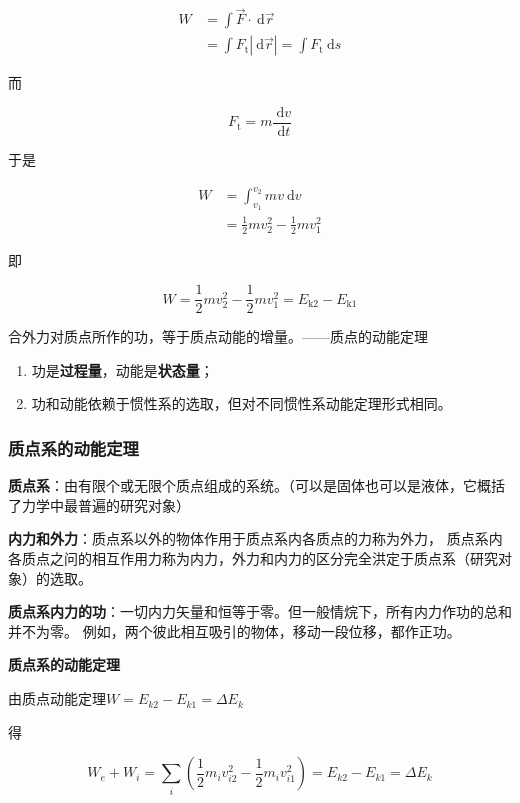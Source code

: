 \documentclass[
	12pt, %
	a4paper, %
]{myLegrandOrangeBook}
\begin{document}
$$
\begin{aligned}
    W & =\int \overrightarrow{F} \cdot \mathrm{~d} \overrightarrow{r} \\
    & =\int F_{\mathrm{t}}|\mathrm{~d} \overrightarrow{r}|=\int F_{\mathrm{t}} \mathrm{~d} s
\end{aligned}
$$

而

$$
    F_{\mathrm{t}}=m \frac{\mathrm{~d} v}{\mathrm{~d} t}
$$

于是

$$
    \begin{aligned}
    W & =\int_{v_1}^{v_2} m v \mathrm{~d} v \\
    & =\frac{1}{2} m v_2^2-\frac{1}{2} m v_1^2
    \end{aligned}
$$

即

\begin{equation}
    W=\frac{1}{2} m v_2^2-\frac{1}{2} m v_1^2=E_{\mathrm{k} 2}-E_{\mathrm{k} 1}
\end{equation}

合外力对质点所作的功，等于质点动能的增量。——质点的动能定理

\begin{enumerate}
    \item 功是\textbf{过程量}，动能是\textbf{状态量}；
    \item 功和动能依赖于惯性系的选取，但对不同惯性系动能定理形式相同。
\end{enumerate}

\subsubsection{质点系的动能定理}

\textbf{质点系}：由有限个或无限个质点组成的系统。（可以是固体也可以是液体，它概括了力学中最普遍的研究对象）

\textbf{内力和外力}：质点系以外的物体作用于质点系内各质点的力称为外力，
质点系内各质点之问的相互作用力称为内力，外力和内力的区分完全洪定于质点系（研究对象）的选取。

\textbf{质点系内力的功}：一切内力矢量和恒等于零。但一般情烷下，所有内力作功的总和并不为零。
例如，两个彼此相互吸引的物体，移动一段位移，都作正功。

\textbf{质点系的动能定理}

由质点动能定理$W=E_{k 2}-E_{k 1}=\Delta E_k$

得

\begin{equation}
    W_e+W_i=\sum_i\left(\frac{1}{2} m_i v_{i 2}^2-\frac{1}{2} m_i v_{i 1}^2\right)=E_{k 2}-E_{k 1}=\Delta E_k
\end{equation}
\end{document}
